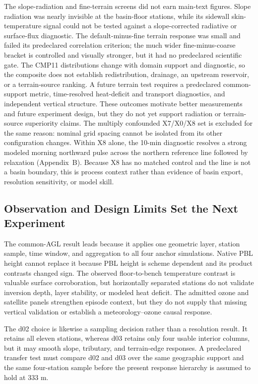 \documentclass[air,article,submit,moreauthors]{Definitions/mdpi}
\begin{document}
The slope-radiation and fine-terrain screens did not earn main-text figures.
Slope radiation was nearly invisible at the basin-floor stations, while its sidewall skin-temperature signal could not be tested against a slope-corrected radiative or surface-flux diagnostic.
The default-minus-fine terrain response was small and failed its predeclared correlation criterion; the much wider fine-minus-coarse bracket is controlled and visually stronger, but it had no predeclared scientific gate.
The CMP11 distributions change with domain support and diagnostic, so the composite does not establish redistribution, drainage, an upstream reservoir, or a terrain-source ranking.
A future terrain test requires a predeclared common-support metric, time-resolved heat-deficit and transport diagnostics, and independent vertical structure.
These outcomes motivate better measurements and future experiment design, but they do not yet support radiation or terrain-source superiority claims.
The multiply confounded X7/X0/X8 set is excluded for the same reason: nominal grid spacing cannot be isolated from its other configuration changes.
Within X8 alone, the 10-min diagnostic resolves a strong modeled morning northward pulse across the northern reference line followed by relaxation (Appendix~B).
Because X8 has no matched control and the line is not a basin boundary, this is process context rather than evidence of basin export, resolution sensitivity, or model skill.

\subsection{Observation and Design Limits Set the Next Experiment}
\label{sec:v3-disc-domains}

The common-AGL result leads because it applies one geometric layer, station sample, time window, and aggregation to all four anchor simulations.
Native PBL height cannot replace it because PBL height is scheme dependent and its product contrasts changed sign.
The observed floor-to-bench temperature contrast is valuable surface corroboration, but horizontally separated stations do not validate inversion depth, layer stability, or modeled heat deficit.
The admitted ozone and satellite panels strengthen episode context, but they do not supply that missing vertical validation or establish a meteorology--ozone causal response.

The d02 choice is likewise a sampling decision rather than a resolution result.
It retains all eleven stations, whereas d03 retains only four usable interior columns, but it may smooth slope, tributary, and terrain-edge responses.
A predeclared transfer test must compare d02 and d03 over the same geographic support and the same four-station sample before the present response hierarchy is assumed to hold at 333 m.
\end{document}
